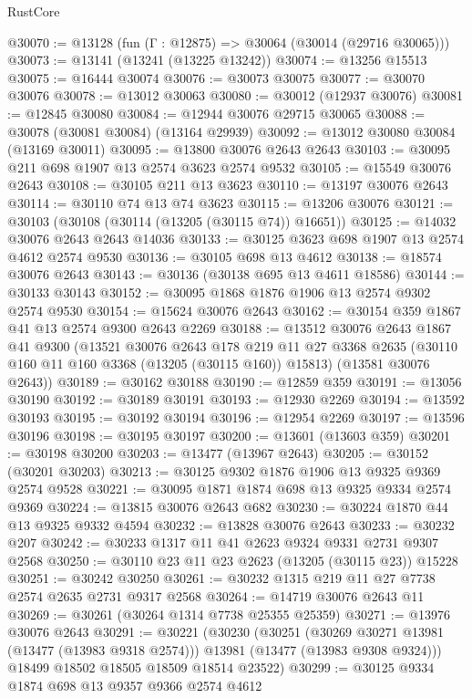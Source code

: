 \begin{lexlean}{RustCore}
\begin{coremodule}
@30070 := @13128 (fun (Γ : @12875) => @30064 (@30014 (@29716 @30065)))
@30073 := @13141 (@13241 (@13225 @13242))
@30074 := @13256 @15513
@30075 := @16444 @30074
@30076 := @30073 @30075
@30077 := @30070 @30076
@30078 := @13012 @30063
@30080 := @30012 (@12937 @30076)
@30081 := @12845 @30080
@30084 := @12944 @30076 @29715 @30065
@30088 := @30078 (@30081 @30084) (@13164 @29939)
@30092 := @13012 @30080 @30084 (@13169 @30011)
@30095 := @13800 @30076 @2643 @2643
@30103 := @30095 @211 @698 @1907 @13 @2574 @3623 @2574 @9532
@30105 := @15549 @30076 @2643
@30108 := @30105 @211 @13 @3623
@30110 := @13197 @30076 @2643
@30114 := @30110 @74 @13 @74 @3623
@30115 := @13206 @30076
@30121 := @30103 (@30108 (@30114 (@13205 (@30115 @74)) @16651))
@30125 := @14032 @30076 @2643 @2643 @14036
@30133 := @30125 @3623 @698 @1907 @13 @2574 @4612 @2574 @9530
@30136 := @30105 @698 @13 @4612
@30138 := @18574 @30076 @2643
@30143 := @30136 (@30138 @695 @13 @4611 @18586)
@30144 := @30133 @30143
@30152 := @30095 @1868 @1876 @1906 @13 @2574 @9302 @2574 @9530
@30154 := @15624 @30076 @2643
@30162 := @30154 @359 @1867 @41 @13 @2574 @9300 @2643 @2269
@30188 := @13512
    @30076
    @2643
    @1867
    @41
    @9300
    (@13521
      @30076
      @2643
      @178
      @219
      @11
      @27
      @3368
      @2635
      (@30110 @160 @11 @160 @3368 (@13205 (@30115 @160)) @15813)
      (@13581 @30076 @2643))
@30189 := @30162 @30188
@30190 := @12859 @359
@30191 := @13056 @30190
@30192 := @30189 @30191
@30193 := @12930 @2269
@30194 := @13592 @30193
@30195 := @30192 @30194
@30196 := @12954 @2269
@30197 := @13596 @30196
@30198 := @30195 @30197
@30200 := @13601 (@13603 @359)
@30201 := @30198 @30200
@30203 := @13477 (@13967 @2643)
@30205 := @30152 (@30201 @30203)
@30213 := @30125 @9302 @1876 @1906 @13 @9325 @9369 @2574 @9528
@30221 := @30095 @1871 @1874 @698 @13 @9325 @9334 @2574 @9369
@30224 := @13815 @30076 @2643 @682
@30230 := @30224 @1870 @44 @13 @9325 @9332 @4594
@30232 := @13828 @30076 @2643
@30233 := @30232 @207
@30242 := @30233 @1317 @11 @41 @2623 @9324 @9331 @2731 @9307 @2568
@30250 := @30110 @23 @11 @23 @2623 (@13205 (@30115 @23)) @15228
@30251 := @30242 @30250
@30261 := @30232 @1315 @219 @11 @27 @7738 @2574 @2635 @2731 @9317 @2568
@30264 := @14719 @30076 @2643 @11
@30269 := @30261 (@30264 @1314 @7738 @25355 @25359)
@30271 := @13976 @30076 @2643
@30291 := @30221
    (@30230
      (@30251
        (@30269 @30271 @13981 (@13477 (@13983 @9318 @2574)))
        @13981
        (@13477 (@13983 @9308 @9324)))
      @18499
      @18502
      @18505
      @18509
      @18514
      @23522)
@30299 := @30125 @9334 @1874 @698 @13 @9357 @9366 @2574 @4612

\end{coremodule}
\end{lexlean}
